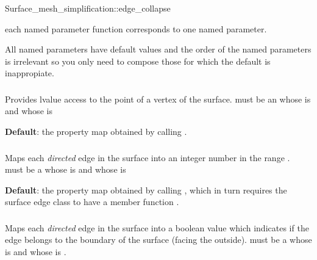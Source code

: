 \begin{ccRefFunction}{Surface_mesh_simplification::edge_collapse}

each named parameter function corresponds to one named parameter.

All named parameters have default values and the order of the named parameters 
is irrelevant so you only need to compose those for which the default
is inappropiate.

\subsubsection{ }

Provides lvalue access to the point of a vertex of the surface.
 must be an 
whose  is
and whose  is 

\textbf{Default}: the property map obtained by calling .


\subsubsection{ }

Maps each {\em directed} edge in the surface into an integer number
in the range \ccc{[0,num_edge(surface)}.\\
 must be a 
whose  is
and whose  is 

\textbf{Default}: the property map obtained by calling , which 
in turn requires the surface edge class to have a member function 
.

\subsubsection{ }

Maps each {\em directed} edge in the surface into a boolean value
which indicates if the edge belongs to the boundary of the surface
(facing the outside).
 must be a 
whose  is
and whose  is .


\end{ccRefFunction}

